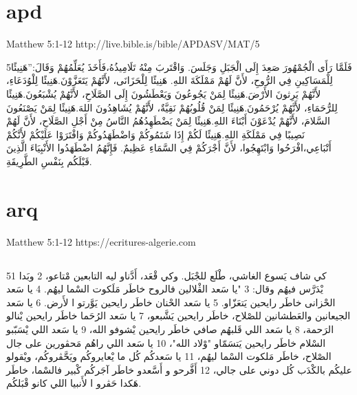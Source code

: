 \documentclass[12pt,fleqn,titlepage,twoside,a4paper]{book}
\begin{document}
\section{apd}

Matthew 5:1-12 http://live.bible.is/bible/APDASV/MAT/5

\begin{arab}[utf]


5فَلَمَّا رَأَى الْجُمْهُورَ صَعِدَ إِلَى الْجَبَلِ وَجَلَسَ. وَاقْتَربَ مِنْهُ تَلَامِيذُهُ،فَأَخَذَ يُعَلِّمُهُمْ وَقَالَ:”هَنِيئًا لِلْمَسَاكِينِ فِي الرُّوحِ، لأَنَّ لَهُمْ مَمْلَكَةَ اللهِ. هَنِيئًا لِلْحَزَانَى، لأَنَّهُمْ يَتَعَزَّوْنَ.هَنِيئًا لِلْوُدَعَاءِ، لأَنَّهُمْ يَرِثونَ الأَرْضَ.هَنِيئًا لِمَنْ يَجُوعُونَ وَيَعْطَشُونَ إِلَى الصَّلَاحِ، لأَنَّهُمْ يُشْبَعُونَ.هَنِيئًا لِلرُّحَمَاءِ، لأَنَّهُمْ يُرْحَمُونَ.هَنِيئًا لِمَنْ قُلُوبُهُمْ نَقِيَّةٌ، لأَنَّهُمْ يُشَاهِدُونَ اللهَ.هَنِيئًا لِمَنْ يَصْنَعُونَ السَّلامَ، لأَنَّهُمْ يُدْعَوْنَ أَبْنَاءَ اللهِ.هَنِيئًا لِمَنْ يَضْطَهِدُهُمُ النَّاسُ مِنْ أَجْلِ الصَّلَاحِ، لأَنَّ لَهُمْ نَصِيبًا فِي مَمْلَكَةِ اللهِ.هَنِيئًا لَكُمْ إِذَا شَتَمُوكُمْ وَاضْطَهَدُوكُمْ وَافْتَرَوْا عَلَيْكُمْ لأَنَّكُمْ أَتْبَاعِي،افْرَحُوا وَابْتَهِجُوا، لأَنَّ أَجْرَكُمْ فِي السَّمَاءِ عَظِيمٌ. فَإِنَّهُمُ اضْطَهَدُوا الأَنْبِيَاءَ الَّذِينَ قَبْلَكُم بِنَفْسِ الطَّرِيقَةِ.
\end{arab}

\section{arq}

Matthew 5:1-12 https://ecritures-algerie.com

\begin{arab}[utf]
\section*{}


51 كي شاف يَسوع الغاشي، طْلَع للجْبَل. وكي قْعَد، أَدَّناو ليه التابعين مْتاعو، 2 وبَدا يْدَرَّس فيهُم وقال: 3 "يا سَعد الڤْلالين فالروح خاطَر
مَلَكوت السْما ليهُم. 4 يا سَعد الحْزانى خاطَر رايحين يَتعَزّاو. 5 يا سَعد الحْنان خاطَر رايحين يَوَّرتو ا لأَرض. 6 يا سَعد الجيعانين
والعَطشانين للصْلاح، خاطَر رايحين يَشَّبعو، 7 يا سَعد الرُحَما خاطَر رايحين يْنالو الرَحمة، 8 يا سَعد اللي قَلبهُم صافي خاطَر رايحين يْشوفو الله،
9 يا سَعد اللي يْسَبّبو السْلام خاطَر رايحين يَتسَمّاو "وْلاد الله"، 10 يا سَعد اللي راهُم مَحڤورين على جال الصْلاح، خاطَر مَلكوت السْما ليهُم، 11 يا
سَعدكُم كُل ما يْعايروكُم ويَحَّڤروكُم، ويْقولو عليكُم بالكْدَب كُل دوني على جالي، 12 أَفَّرحو و أَسَّعدو خاطَر آجَركُم كْبير فالسْما، خاطَر هَكدا حَڤرو
ا لأَنبيا اللي كانو قْبَلكُم.
\end{arab}
\end{document}
